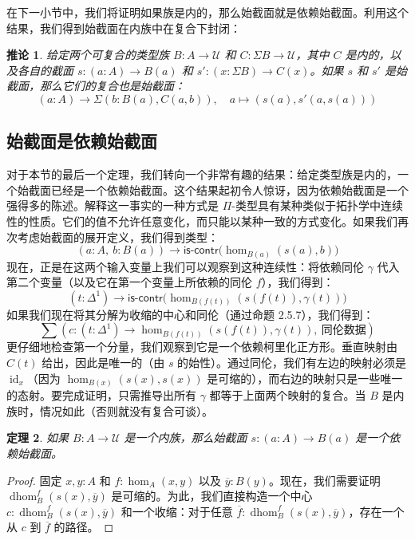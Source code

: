 \documentclass{ctexrep}
\theoremstyle{plain}
\newtheorem{theorem}{定理}[section]
\newtheorem{corollary}[theorem]{推论}
\theoremstyle{definition}
\theoremstyle{remark}
\theoremstyle{definition}
\theoremstyle{definition}
\theoremstyle{definition}
\newcommand{\id}{\operatorname{id}}
\newcommand{\iscontr}{\mathsf{is\text{-}contr}}
\newcommand{\UU}{\mathcal{U}}
\newcommand{\dhom}{\operatorname{dhom}}
\begin{document}
在下一小节中，我们将证明如果族是内的，那么始截面就是依赖始截面。利用这个结果，我们得到始截面在内族中在复合下封闭：

\begin{corollary}
给定两个可复合的类型族 $B:A\to\UU$ 和 $C:\Sigma B\to\UU$，其中 $C$ 是内的，以及各自的截面 $s:(a:A)\to B(a)$ 和 $s':(x:\Sigma B)\to C(x)$。如果 $s$ 和 $s'$ 是始截面，那么它们的复合也是始截面：
\[
(a:A) \to \Sigma(b:B(a),C(a,b)), \quad a \mapsto (s(a), s'(a,s(a)))
\]
\end{corollary}

\subsection{始截面是依赖始截面}

对于本节的最后一个定理，我们转向一个非常有趣的结果：给定类型族是内的，一个始截面已经是一个依赖始截面。这个结果起初令人惊讶，因为依赖始截面是一个强得多的陈述。解释这一事实的一种方式是 $\Pi$-类型具有某种类似于拓扑学中连续性的性质。它们的值不允许任意变化，而只能以某种一致的方式变化。如果我们再次考虑始截面的展开定义，我们得到类型：
\[
(a:A,\ b:B(a)) \to \iscontr\big(\hom_{B(a)}(s(a),b)\big)
\]
现在，正是在这两个输入变量上我们可以观察到这种连续性：将依赖同伦 $\gamma$ 代入第二个变量（以及它在第一个变量上所依赖的同伦 $f$），我们得到：
\[
(t:\Delta^1) \to \iscontr\big(\hom_{B(f(t))}(s(f(t)), \gamma(t))\big)
\]
如果我们现在将其分解为收缩的中心和同伦（通过命题 2.5.7），我们得到：
\[
\sum\left(c:(t:\Delta^1)\to \hom_{B(f(t))}(s(f(t)), \gamma(t)),\ \text{同伦数据}\right)
\]
更仔细地检查第一个分量，我们观察到它是一个依赖柯里化正方形。垂直映射由 $C(t)$ 给出，因此是唯一的（由 $s$ 的始性）。通过同伦，我们有左边的映射必须是 $\id_x$（因为 $\hom_{B(x)}(s(x),s(x))$ 是可缩的），而右边的映射只是一些唯一的态射。要完成证明，只需推导出所有 $\gamma$ 都等于上面两个映射的复合。当 $B$ 是内族时，情况如此（否则就没有复合可谈）。

\begin{theorem}
如果 $B:A\to\UU$ 是一个内族，那么始截面 $s:(a:A)\to B(a)$ 是一个依赖始截面。
\end{theorem}

\begin{proof}
固定 $x,y:A$ 和 $f:\hom_A(x,y)$ 以及 $\overline{y}:B(y)$。现在，我们需要证明 $\dhom_B^f(s(x),\overline{y})$ 是可缩的。为此，我们直接构造一个中心 $c:\dhom_B^f(s(x),\overline{y})$ 和一个收缩：对于任意 $\overline{f}:\dhom_B^f(s(x),\overline{y})$，存在一个从 $c$ 到 $\overline{f}$ 的路径。
\end{proof}
\end{document}
